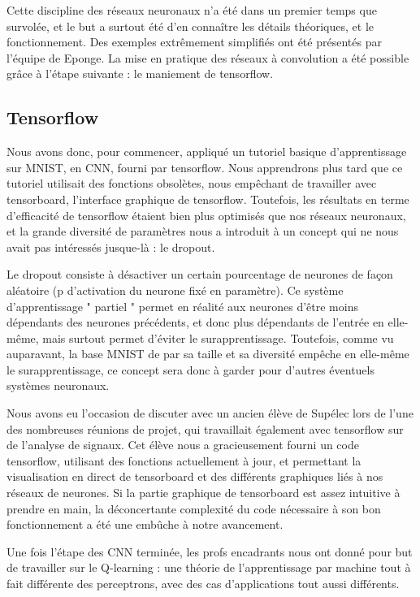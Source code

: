 \documentclass[
    10pt,
    a4paper,
    oneside,
    headinclude,footinclude,
    BCOR=5mm,
]{scrartcl}
\begin{document}
Cette discipline des réseaux neuronaux n'a été dans un premier temps que survolée, et le but a surtout été d'en connaître les détails théoriques, et le fonctionnement. Des exemples extrêmement simplifiés ont été présentés par l'équipe de Eponge. La mise en pratique des réseaux à convolution a été possible grâce à l'étape suivante : le maniement de tensorflow. 

\subsection{Tensorflow}

Nous avons donc, pour commencer, appliqué un tutoriel basique d'apprentissage sur MNIST, en CNN, fourni par tensorflow. Nous apprendrons plus tard que ce tutoriel utilisait des fonctions obsolètes, nous empêchant de travailler avec tensorboard, l'interface graphique de tensorflow. Toutefois, les résultats en terme d'efficacité de tensorflow étaient bien plus optimisés que nos réseaux neuronaux, et la grande diversité de paramètres nous a introduit à un concept qui ne nous avait pas intéressés jusque-là : le dropout.

Le dropout consiste à désactiver un certain pourcentage de neurones de façon aléatoire (p d'activation du neurone fixé en paramètre). Ce système d'apprentissage " partiel " permet en réalité aux neurones d'être moins dépendants des neurones précédents, et donc plus dépendants de l'entrée en elle-même, mais surtout permet d'éviter le surapprentissage. Toutefois, comme vu auparavant, la base MNIST de par sa taille et sa diversité empêche en elle-même le surapprentissage, ce concept sera donc à garder pour d'autres éventuels systèmes neuronaux.

Nous avons eu l'occasion de discuter avec un ancien élève de Supélec lors de l'une des nombreuses réunions de projet, qui travaillait également avec tensorflow sur de l'analyse de signaux. Cet élève nous a gracieusement fourni un code tensorflow, utilisant des fonctions actuellement à jour, et permettant la visualisation en direct de tensorboard et des différents graphiques liés à nos réseaux de neurones. Si la partie graphique de tensorboard est assez intuitive à prendre en main, la déconcertante complexité du code nécessaire à son bon fonctionnement a été une embûche à notre avancement.

Une fois l'étape des CNN terminée, les profs encadrants nous ont donné pour but de travailler sur le Q-learning : une théorie de l'apprentissage par machine tout à fait différente des perceptrons, avec des cas d'applications tout aussi différents.
\end{document}
